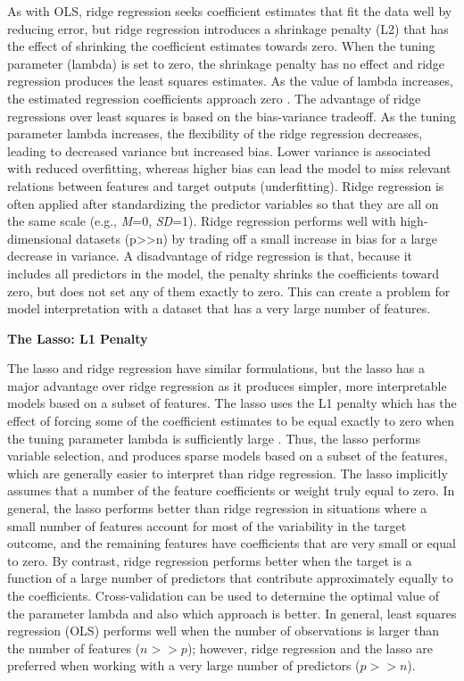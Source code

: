 \documentclass[sigconf]{acmart}
\begin{document}
As with OLS, ridge regression seeks coefficient estimates that fit the data 
well by reducing error, but ridge regression introduces a shrinkage penalty
(L2) that has the effect of shrinking the coefficient estimates towards zero. 
When the tuning parameter (lambda) is set to zero, the shrinkage penalty has 
no effect and ridge regression produces the least squares estimates. As the 
value of lambda increases, the estimated regression coefficients approach zero 
\cite{statlearn13}. The advantage of ridge regressions over least squares is 
based on the bias-variance tradeoff. As the tuning parameter lambda increases, 
the flexibility of the ridge regression decreases, leading to decreased variance 
but increased bias. Lower variance is associated with reduced overfitting, 
whereas higher bias can lead the model to miss relevant relations between
features and target outputs (underfitting). Ridge regression is often applied 
after standardizing the predictor variables so that they are all on the same 
scale (e.g., \textit{M}=0, \textit{SD}=1). Ridge regression performs well with
high-dimensional datasets (p>>n) by trading off a small increase in bias for a 
large decrease in variance. A disadvantage of ridge regression is that, because 
it includes all predictors in the model, the penalty shrinks the coefficients 
toward zero, but does not set any of them exactly to zero. This can create a 
problem for model interpretation with a dataset that has a very large number
of features. 


\textbf{The Lasso: L1 Penalty} 

The lasso and ridge regression have similar formulations, but the lasso has 
a major advantage over ridge regression as it produces simpler, more 
interpretable models based on a subset of features. The lasso uses the L1 
penalty which has the effect of forcing some of the coefficient estimates to be
equal exactly to zero when the tuning parameter lambda is sufficiently large 
\cite{statlearn13}. Thus, the lasso performs variable selection, and produces 
sparse models based on a subset of the features, which are generally easier to 
interpret than ridge regression. The lasso implicitly assumes that a number of 
the feature coefficients or weight truly equal to zero. In general, the lasso 
performs better than ridge regression in situations where a small number of 
features account for most of the variability in the target outcome, and the 
remaining features have coefficients that are very small or equal to zero. 
By contrast, ridge regression performs better when the target is a function 
of a large number of predictors that contribute approximately equally to the
coefficients. Cross-validation can be used to determine the optimal value
of the parameter lambda and also which approach is better. In general, least 
squares regression (OLS) performs well when the number of observations is 
larger than the number of features ($\textit{n}>>\textit{p}$); however, ridge 
regression and the lasso are preferred when working with a very large number 
of predictors ($\textit{p}>>\textit{n}$).
\end{document}
